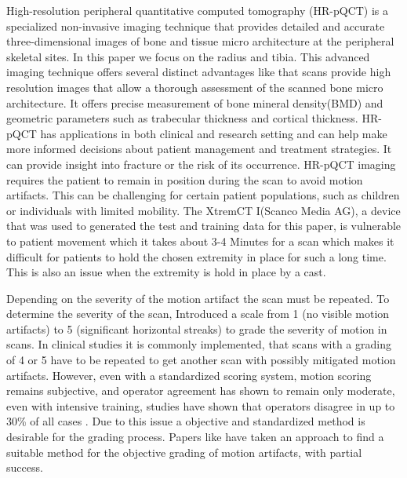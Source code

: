 \documentclass[
a4paper, 
12pt,
grayscalebody, %
abstract=on,
twoside, BCOR10mm, 12pt, DIV13,headinclude, footexclude, final, abstracton, openright
]{ibireprt}
\numberwithin{equation}{chapter}
\numberwithin{table}{chapter}
\numberwithin{figure}{chapter}
\numberwithin{algorithm}{chapter}
\numberwithin{example}{chapter}
\numberwithin{example}{chapter}
\begin{document}
High-resolution peripheral quantitative computed tomography (HR-pQCT) is a specialized non-invasive imaging technique that provides detailed and accurate three-dimensional images of bone and tissue micro architecture at the peripheral skeletal sites. In this paper we focus  on the radius and tibia. This advanced imaging technique offers several distinct advantages like that scans provide high resolution images that allow a thorough assessment of the scanned bone micro architecture. It offers precise measurement of bone mineral density(BMD) and geometric parameters such as trabecular thickness and cortical thickness. HR-pQCT has applications in both clinical and research setting and can help make more informed decisions about patient management and treatment strategies. It can provide insight into fracture or the risk of its occurrence. HR-pQCT imaging requires the patient to remain in position during the scan to avoid motion artifacts. This can be challenging for certain patient populations, such as children or individuals with limited  mobility. The XtremCT I(Scanco Media AG), a device that  was used to generated the test and training data for this paper, is vulnerable to patient movement which it takes about 3-4 Minutes for a scan which makes it difficult for patients to hold the chosen extremity in place for such a long time. This is also an issue when the extremity is hold in place by a cast.

 Depending on the severity of the motion artifact the scan must be repeated. To determine the severity of the scan, \cite{Whittier2020} Introduced a scale from 1 (no visible motion artifacts) to 5 (significant horizontal streaks) to grade the severity of motion in scans. In clinical studies it is commonly implemented, that scans with a grading of 4 or 5 have to be repeated to get another scan with possibly mitigated motion artifacts. However, even with a standardized scoring system, motion scoring remains subjective, and operator agreement has shown to remain only moderate, even with intensive training, studies have shown that operators disagree in up to 30\% of all cases \cite{Walle2023}. Due to this issue a objective and standardized method is desirable for the grading process. Papers like \cite{Walle2023} have taken an approach to find a suitable method for the objective grading of motion artifacts, with partial success.
 
\end{document}
